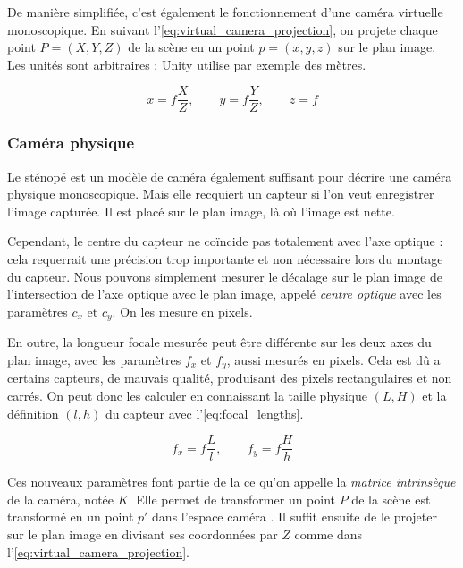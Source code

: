 
De manière simplifiée, c'est également le fonctionnement d'une caméra virtuelle monoscopique. En suivant l'\autoref{eq:virtual_camera_projection}, on projete chaque point $P=(X,Y,Z)$ de la scène en un point $p=(x,y,z)$ sur le plan image. Les unités sont arbitraires ; Unity utilise par exemple des mètres.

\begin{equation}
  \label{eq:virtual_camera_projection}
  x = f \frac{X}{Z},\qquad y = f \frac{Y}{Z},\qquad z = f
\end{equation}

\subsubsection{Caméra physique}
Le sténopé est un modèle de caméra également suffisant pour décrire une caméra physique monoscopique. Mais elle recquiert un capteur si l'on veut enregistrer l'image capturée. Il est placé sur le plan image, là où l'image est nette.

Cependant, le centre du capteur ne coïncide pas totalement avec l'axe optique : cela requerrait une précision trop importante et non nécessaire lors du montage du capteur. Nous pouvons simplement mesurer le décalage sur le plan image de l'intersection de l'axe optique avec le plan image, appelé \emph{centre optique} avec les paramètres $c_x$ et $c_y$. On les mesure en pixels.

En outre, la longueur focale mesurée peut être différente sur les deux axes du plan image, avec les paramètres $f_x$ et $f_y$, aussi mesurés en pixels. Cela est dû a certains capteurs, de mauvais qualité, produisant des pixels rectangulaires et non carrés. On peut donc les calculer en connaissant la taille physique $(L,H)$ et la définition $(l,h)$ du capteur avec l'\autoref{eq:focal_lengths}.

\begin{equation}
  \label{eq:focal_lengths}
  f_x = f \frac{L}{l},\qquad f_y = f \frac{H}{h}
\end{equation}

Ces nouveaux paramètres font partie de la ce qu'on appelle la \emph{matrice intrinsèque} de la caméra, notée $K$. Elle permet de transformer un point $P$ de la scène est transformé en un point $p'$ dans l'espace caméra . Il suffit ensuite de le projeter sur le plan image en divisant ses coordonnées par $Z$ comme dans l'\autoref{eq:virtual_camera_projection}.


